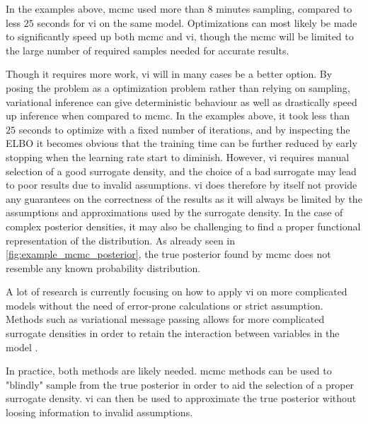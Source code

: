 In the examples above, \acrshort{mcmc} used more than $8$ minutes sampling, compared to less $25$ seconds for \acrshort{vi} on the same model. Optimizations can most likely be made to significantly speed up both \acrshort{mcmc} and \acrshort{vi}, though the \acrshort{mcmc} will be limited to the large number of required samples needed for accurate results. 



Though it requires more work, \acrshort{vi} will in many cases be a better option. By posing the problem as a optimization problem rather than relying on sampling, variational inference can give deterministic behaviour as well as drastically speed up inference when compared to \acrshort{mcmc}. In the examples above, it took less than $25$ seconds to optimize with a fixed number of iterations, and by inspecting the ELBO it becomes obvious that the training time can be further reduced by early stopping when the learning rate start to diminish. 
However, \acrshort{vi} requires manual selection of a good surrogate density, and the choice of a bad surrogate may lead to poor results due to invalid assumptions. \acrshort{vi} does therefore by itself not provide any guarantees on the correctness of the results as it will always be limited by the assumptions and approximations used by the surrogate density. In the case of complex posterior densities, it may also be challenging to find a proper functional representation of the distribution. As already seen in \cref{fig:example_mcmc_posterior}, the true posterior found by \acrshort{mcmc} does not resemble any known probability distribution. 

A lot of research is currently focusing on how to apply \acrshort{vi} on more complicated models without the need of error-prone calculations or strict assumption. Methods such as variational message passing allows for more complicated surrogate densities in order to retain the interaction between variables in the model \cite{winnbishop}. 

In practice, both methods are likely needed. \acrshort{mcmc} methods can be used to "blindly" sample from the true posterior in order to aid the selection of a proper surrogate density. \acrshort{vi} can then be used to approximate the true posterior without loosing information to invalid assumptions. 

\section{}

